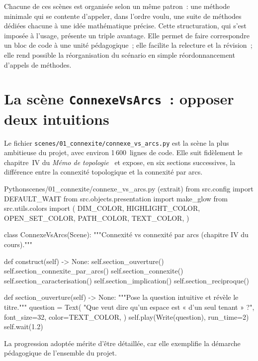 \documentclass[12pt, a4paper, openany]{report}
\begin{document}
	Chacune de ces scènes est organisée selon un même patron~: une méthode  minimale qui se contente d’appeler, dans l’ordre voulu, une suite de méthodes  dédiées chacune à une idée mathématique précise. Cette structuration, qui s’est imposée à l’usage, présente un triple avantage. Elle permet de faire correspondre un bloc de code à une unité pédagogique~; elle facilite la relecture et la révision~; elle rend possible la réorganisation du scénario en simple réordonnancement d’appels de méthodes.

	\section{La scène \texttt{ConnexeVsArcs}~: opposer deux intuitions}

	Le fichier \texttt{scenes/01\_connexite/connexe\_vs\_arcs.py} est la scène la plus ambitieuse du projet, avec environ 1\,600~lignes de code. Elle suit fidèlement le chapitre~IV du \textit{Mémo de topologie}~\cite{lerouxklopp} et expose, en six sections successives, la différence entre la connexité topologique et la connexité par arcs.

	\begin{codefile}{Python}{scenes/01\_connexite/connexe\_vs\_arcs.py (extrait)}
from src.config import DEFAULT_WAIT
from src.objects.presentation import make_glow
from src.utils.colors import (
    DIM_COLOR, HIGHLIGHT_COLOR, OPEN_SET_COLOR, PATH_COLOR, TEXT_COLOR,
)


class ConnexeVsArcs(Scene):
    """Connexité vs connexité par arcs (chapitre IV du cours)."""

    def construct(self) -> None:
        self.section_ouverture()
        self.section_connexite_par_arcs()
        self.section_connexite()
        self.section_caracterisation()
        self.section_implication()
        self.section_reciproque()

    def section_ouverture(self) -> None:
        """Pose la question intuitive et révèle le titre."""
        question = Text(
            "Que veut dire qu'un espace est « d'un seul tenant » ?",
            font_size=32,
            color=TEXT_COLOR,
        )
        self.play(Write(question), run_time=2)
        self.wait(1.2)
	\end{codefile}

	La progression adoptée mérite d’être détaillée, car elle exemplifie la démarche pédagogique de l’ensemble du projet.
\end{document}
